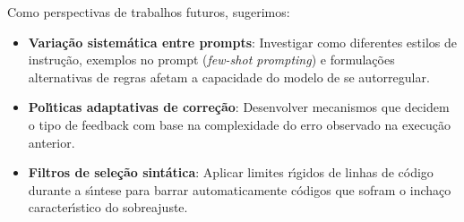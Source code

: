 Como perspectivas de trabalhos futuros, sugerimos:
\begin{itemize}
    \item \textbf{Varia\c{c}\~{a}o sistem\'{a}tica entre prompts}: Investigar como diferentes estilos de instru\c{c}\~{a}o, exemplos no prompt (\textit{few-shot prompting}) e formula\c{c}\~{o}es alternativas de regras afetam a capacidade do modelo de se autorregular.
    \item \textbf{Pol\'{\i}ticas adaptativas de corre\c{c}\~{a}o}: Desenvolver mecanismos que decidem o tipo de feedback com base na complexidade do erro observado na execu\c{c}\~{a}o anterior.
    \item \textbf{Filtros de sele\c{c}\~{a}o sint\'{a}tica}: Aplicar limites r\'{\i}gidos de linhas de c\'{o}digo durante a s\'{\i}ntese para barrar automaticamente c\'{o}digos que sofram o incha\c{c}o caracter\'{\i}stico do sobreajuste.
\end{itemize}

